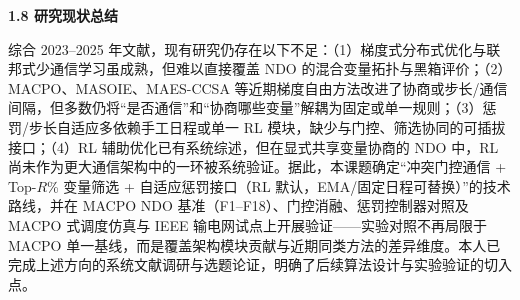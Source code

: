 \par
\indent
\textbf{1.8 研究现状总结}
\par
综合 2023--2025 年文献，现有研究仍存在以下不足：（1）梯度式分布式优化与联邦式少通信学习虽成熟，但难以直接覆盖 NDO 的混合变量拓扑与黑箱评价；（2）MACPO、MASOIE、MAES-CCSA 等近期梯度自由方法改进了协商或步长/通信间隔，但多数仍将“是否通信”和“协商哪些变量”解耦为固定或单一规则；（3）惩罚/步长自适应多依赖手工日程或单一 RL 模块，缺少与门控、筛选协同的可插拔接口；（4）RL 辅助优化已有系统综述\cite{song2024}，但在显式共享变量协商的 NDO 中，RL 尚未作为更大通信架构中的一环被系统验证。据此，本课题确定“冲突门控通信 + Top-$R$\% 变量筛选 + 自适应惩罚接口（RL 默认，EMA/固定日程可替换）”的技术路线，并在 MACPO NDO 基准（F1--F18）、门控消融、惩罚控制器对照及 MACPO 式调度仿真与 IEEE 输电网试点上开展验证——实验对照不再局限于 MACPO 单一基线，而是覆盖架构模块贡献与近期同类方法的差异维度。本人已完成上述方向的系统文献调研与选题论证，明确了后续算法设计与实验验证的切入点。

